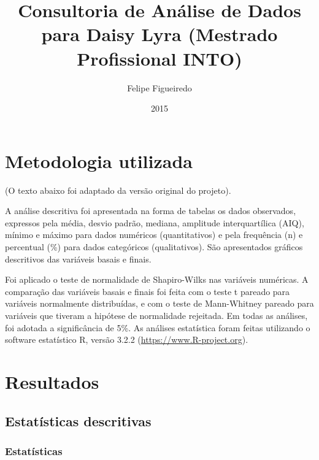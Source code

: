 \documentclass[a4paper]{article}
\author{Felipe Figueiredo}
\title{Consultoria de Análise de Dados para Daisy Lyra (Mestrado Profissional INTO)}
\date{2015}
\begin{document}
\maketitle
\newpage
\tableofcontents
\listoffigures
\listoftables
\newpage
\section{Metodologia utilizada}

(O texto abaixo foi adaptado da versão original do projeto).


A análise descritiva foi apresentada na forma de tabelas os dados observados, expressos pela média, desvio padrão, mediana, amplitude interquartílica (AIQ), mínimo e máximo para dados numéricos (quantitativos) e pela frequência (n) e percentual (\%) para dados categóricos (qualitativos). São apresentados gráficos descritivos das variáveis basais e finais.

Foi aplicado o teste de normalidade de Shapiro-Wilks nas variáveis numéricas. A comparação das variáveis basais e finais foi feita com o teste t pareado para variáveis normalmente distribuídas,  e com o teste de Mann-Whitney pareado para variáveis que tiveram a hipótese de normalidade rejeitada. Em todas as análises, foi adotada a  significância de 5\%. As análises estatística foram feitas utilizando o software estatístico R, versão 3.2.2 (\url{https://www.R-project.org}).

\section{Resultados}

\subsection{Estatísticas descritivas}

\subsubsection{Estatísticas}
\end{document}
